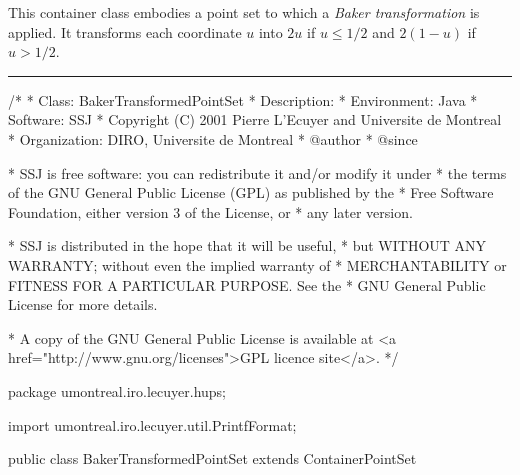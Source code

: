 
This container class embodies a point set to which a
\emph{Baker transformation} is applied.
It transforms each coordinate $u$ into $2u$ if $u \le 1/2$
and $2(1-u)$ if $u > 1/2$.


\bigskip\hrule\bigskip

\begin{code}
\begin{hide}
/*
 * Class:        BakerTransformedPointSet
 * Description:  
 * Environment:  Java
 * Software:     SSJ 
 * Copyright (C) 2001  Pierre L'Ecuyer and Universite de Montreal
 * Organization: DIRO, Universite de Montreal
 * @author       
 * @since

 * SSJ is free software: you can redistribute it and/or modify it under
 * the terms of the GNU General Public License (GPL) as published by the
 * Free Software Foundation, either version 3 of the License, or
 * any later version.

 * SSJ is distributed in the hope that it will be useful,
 * but WITHOUT ANY WARRANTY; without even the implied warranty of
 * MERCHANTABILITY or FITNESS FOR A PARTICULAR PURPOSE.  See the
 * GNU General Public License for more details.

 * A copy of the GNU General Public License is available at
   <a href="http://www.gnu.org/licenses">GPL licence site</a>.
 */
\end{hide}
package umontreal.iro.lecuyer.hups;\begin{hide}

import umontreal.iro.lecuyer.util.PrintfFormat;
\end{hide}

public class BakerTransformedPointSet extends ContainerPointSet \begin{hide} {
\end{hide}
\end{code}

